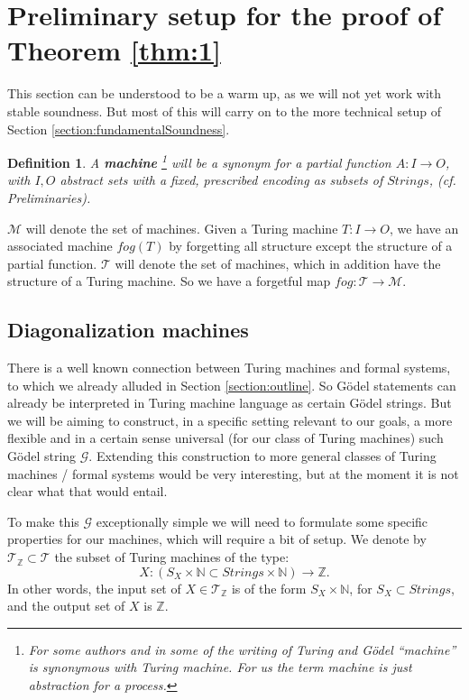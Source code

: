 \documentclass{amsart}  %
\numberwithin{equation}{section}
\newtheorem{definition}[equation]{Definition}
\theoremstyle{definition}
\theoremstyle{remark}
\begin{document}
{\section {Preliminary setup for the proof of Theorem \ref{thm:1}}
This section can be understood to be a warm up, as we will not yet work with stable soundness. But most of this will carry on to the more technical 
setup of Section \ref{section:fundamentalSoundness}.
\begin{definition} A \textbf{\emph{machine}} \footnote {For some authors and in some of the writing of Turing and G\"odel ``machine'' is synonymous with Turing machine. For us the term machine is just abstraction for a process.} will be a synonym for a partial function  $A: I \to O$, with $I,O$ abstract sets with a fixed, prescribed encoding as subsets of $Strings$, (cf. Preliminaries).  
\end{definition} $\mathcal{M}$ will denote the set of machines.  Given a Turing machine $T: I \to O$,  we have an associated machine $fog(T)$ by forgetting all structure except the structure of a partial function.  $\mathcal{T}$ will denote the set of machines, which in addition have the structure of a Turing machine.  So we have a forgetful map $fog: \mathcal{T} \to \mathcal{M}$.

  
\subsection {Diagonalization machines} \label{sec:diagonalizationmachines}
There is a well known connection between Turing machines and formal systems, to which we already alluded in Section \ref{section:outline}. So G\"odel statements  can already be interpreted in Turing machine language as certain G\"odel strings. But we will be aiming to construct, in a specific setting relevant to our goals, a more flexible and in a certain sense universal (for our class of Turing machines) such G\"odel string $\mathcal{G}$.  Extending this construction to more general classes of Turing machines / formal systems would be very interesting, but at the moment it is not clear what that would entail.  

 To make this $\mathcal{G}$ exceptionally simple we will need to formulate some specific properties for our machines, which will require a bit of setup.  We denote by $\mathcal{T} _{\mathbb{Z}} \subset \mathcal{T} $ the subset of Turing machines of the type: \begin{equation*}
   X:  (S _{X}  \times \mathbb{N} \subset Strings \times \mathbb{N}) \to \mathbb{Z}.
\end{equation*}
In other words, the input set of $X \in \mathcal{T} _{\mathbb{Z}}$ is of the form
$S _{X}  \times \mathbb{N}$, for $S _{X} \subset Strings $, and the output set of $X$ is $\mathbb{Z}$.

}
\end{document}
